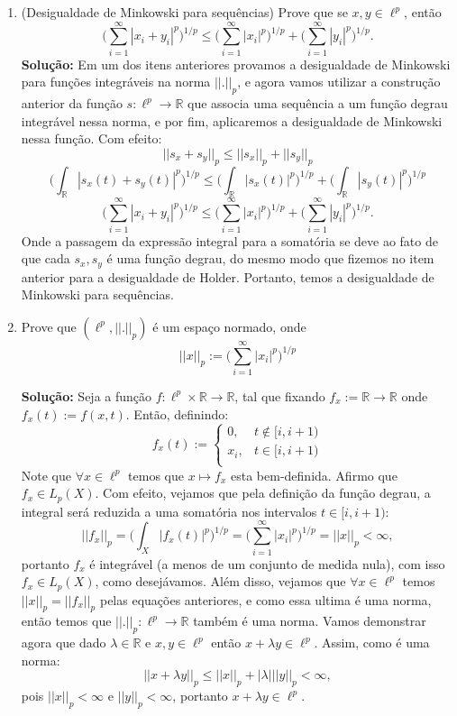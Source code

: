 \documentclass{article}
\begin{document}
\begin{enumerate}
\begin{enumerate}
				\item (Desigualdade de Minkowski para sequências) Prove que se $x, y \in \ell^{p}$, então
				$$
				\Big( \sum \limits_{i=1}^{\infty}|x_{i}+y_{i}|^{p} \Big)^{1/p} \leq \Big( \sum \limits_{i=1}^{\infty}|x_{i}|^{p} \Big)^{1/p} + \Big( \sum \limits_{i=1}^{\infty}|y_{i}|^{p} \Big)^{1/p}.
				$$
				\textbf{Solução:} Em um dos itens anteriores provamos a desigualdade de Minkowski para funções integráveis na norma $||.||_{p}$, e agora vamos utilizar a construção anterior da função $s: \ell^{p} \to \mathbb{R}$ que associa uma sequência a um função degrau integrável nessa norma, e por fim, aplicaremos a desigualdade de Minkowski nessa função. Com efeito:
				$$
				||s_{x} + s_{y}||_{p} \leq 	||s_{x} ||_{p} + ||s_{y}||_{p} 
				$$
				$$
				\Big( \int_{\mathbb{R}}|s_{x}(t)+s_{y}(t)|^{p} \Big)^{1/p} \leq \Big( \int_{\mathbb{R}}|s_{x}(t)|^{p} \Big)^{1/p}+\Big( \int_{\mathbb{R}}|s_{y}(t)|^{p} \Big)^{1/p}  
				$$
				$$
				\Big( \sum \limits_{i=1}^{\infty}|x_{i}+y_{i}|^{p} \Big)^{1/p} \leq \Big( \sum \limits_{i=1}^{\infty}|x_{i}|^{p} \Big)^{1/p} + \Big( \sum \limits_{i=1}^{\infty}|y_{i}|^{p} \Big)^{1/p}.
				$$
				Onde a passagem da expressão integral para a somatória se deve ao fato de que cada $s_{x}, s_{y}$ é uma função degrau, do mesmo modo que fizemos no item anterior para a desigualdade de Holder. Portanto, temos a desigualdade de Minkowski para sequências.
				
				\item Prove que $(\ell^{p}, ||.||_p)$ é um espaço normado, onde
				$$
				||x||_{p} := \Big(\sum \limits_{i=1}^{\infty} |x_{i}|^{p}\Big)^{1/p}
				$$
				
				\textbf{Solução:} Seja a função $f: \ell^{p} \times \mathbb{R} \to \mathbb{R}$, tal que fixando $f_{x} := \mathbb{R} \to \mathbb{R}$ onde $f_{x}(t) := f(x, t)$. Então, definindo:
				$$
				f_{x}(t) := \left\{
				\begin{array}{cc}
				0, & t \notin [i, i+1)\\
				x_{i}, & t \in [i, i+1) \\
				\end{array}
				\right.
				$$
				Note que $\forall x \in \ell^{p}$ temos que $x \mapsto f_{x}$ esta bem-definida. Afirmo que $f_{x} \in L_{p}(X)$. Com efeito, vejamos que pela definição da função degrau, a integral será reduzida a uma somatória nos intervalos $t \in [i, i+1)$: 
				$$
				||f_{x}||_{p} = \Big(\int_{X}|f_x(t)|^{p}\Big)^{1/p} = \Big(\sum \limits_{i=1}^{\infty}|x_i|^{p}\Big)^{1/p} = ||x||_{p} < \infty, 
				$$
				portanto $f_{x}$ é integrável (a menos de um conjunto de medida nula), com isso $f_{x} \in L_{p}(X)$, como desejávamos. Além disso, vejamos que $\forall x \in \ell^{p}$ temos $||x||_{p} = ||f_{x}||_{p}$ pelas equações anteriores, e como essa ultima é uma norma, então temos que $||.||_{p}: \ell^{p} \to \mathbb{R}$ também é uma norma. Vamos demonstrar agora que dado $\lambda \in \mathbb{R}$ e $x, y \in \ell^{p}$ então $x+\lambda y \in \ell^{p}$. Assim, como é uma norma:
				$$
				||x+\lambda y||_{p} \leq ||x||_{p} + |\lambda |||y||_{p} < \infty,
				$$
				pois $||x||_{p} < \infty$ e $||y||_{p} < \infty$, portanto $x+\lambda y \in \ell^{p}$.
				

\end{enumerate}
\end{enumerate}
\end{document}
